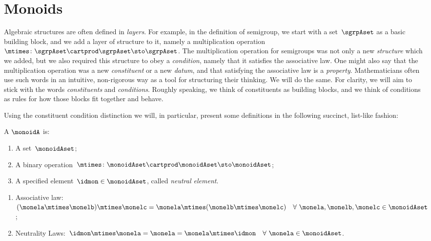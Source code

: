 
\section{Monoids}
\label{sec:parallelism-monoids}

Algebraic structures are often defined in \emph{layers}.
For example, in the definition of semigroup, we start with a set~$\sgrpAset$ as a basic building block, and we add a layer of structure to it, namely a multiplication operation~$\mtimes \colon \sgrpAset \cartprod \sgrpAset \sto \sgrpAset$.
The multiplication operation for semigroups was not only a new \emph{structure} which we added, but we also required this structure to obey a \emph{condition}, namely that it satisfies the associative law.
One might also say that the multiplication operation was a new \emph{constituent} or a new \emph{datum}, and that satisfying the associative law is a \emph{property}.
Mathematicians often use such words in an intuitive, non-rigorous way as a tool for structuring their thinking.
We will do the same.
For clarity, we will aim to stick with the words \emph{constituents} and \emph{conditions}.
Roughly speaking, we think of constituents as building blocks, and we think of conditions as rules for how those blocks fit together and behave.

Using the constituent \vs condition distinction we will, in particular, present some definitions in the following succinct, list-like fashion:

\begin{ctdefinition}[Monoid]
    \label{def:monoid}
    A \emph{}  $\monoidA$  is:
    \begin{body}
        \constit
        \begin{enumerate}
            \item A set~$\monoidAset$;
            \item A binary operation~$\mtimes  \colon \monoidAset \cartprod \monoidAset \sto \monoidAset$;
            \item A specified element~$\idmon \in \monoidAset$, called \emph{neutral element}.
        \end{enumerate}
        \condit
        \begin{enumerate}
            \item Associative law:~$(\monela\mtimes  \monelb)\mtimes  \monelc=
                      \monela\mtimes  (\monelb\mtimes  \monelc) \quad  \forall \  \monela, \monelb, \monelc \in \monoidAset$;
            \item Neutrality Laws:~$\idmon\mtimes \monela=\monela=\monela\mtimes  \idmon \quad  \forall \ \monela \in \monoidAset $.
        \end{enumerate}
    \end{body}
\end{ctdefinition}

